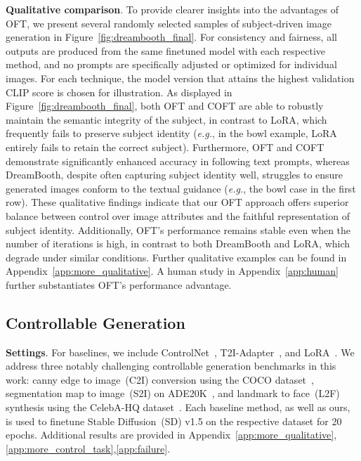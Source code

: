 \textbf{Qualitative comparison}. To provide clearer insights into the advantages of OFT, we present several randomly selected samples of subject-driven image generation in Figure~\ref{fig:dreambooth_final}. For consistency and fairness, all outputs are produced from the same finetuned model with each respective method, and no prompts are specifically adjusted or optimized for individual images. For each technique, the model version that attains the highest validation CLIP score is chosen for illustration. As displayed in Figure~\ref{fig:dreambooth_final}, both OFT and COFT are able to robustly maintain the semantic integrity of the subject, in contrast to LoRA, which frequently fails to preserve subject identity (\emph{e.g.}, in the bowl example, LoRA entirely fails to retain the correct subject). Furthermore, OFT and COFT demonstrate significantly enhanced accuracy in following text prompts, whereas DreamBooth, despite often capturing subject identity well, struggles to ensure generated images conform to the textual guidance (\emph{e.g.}, the bowl case in the first row). These qualitative findings indicate that our OFT approach offers superior balance between control over image attributes and the faithful representation of subject identity. Additionally, OFT's performance remains stable even when the number of iterations is high, in contrast to both DreamBooth and LoRA, which degrade under similar conditions. Further qualitative examples can be found in Appendix~\ref{app:more_qualitative}. A human study in Appendix~\ref{app:human} further substantiates OFT's performance advantage.

\subsection{Controllable Generation}

\textbf{Settings}. For baselines, we include ControlNet~\cite{zhang2023adding}, T2I-Adapter~\cite{mou2023t2i}, and LoRA~\cite{hulora2022}. We address three notably challenging controllable generation benchmarks in this work: canny edge to image~(C2I) conversion using the COCO dataset~\cite{lin2014microsoft}, segmentation map to image~(S2I) on ADE20K~\cite{zhou2017scene}, and landmark to face~(L2F) synthesis using the CelebA-HQ dataset~\cite{karras2018progressive,xia2021tedigan}. Each baseline method, as well as ours, is used to finetune Stable Diffusion~(SD) v1.5 on the respective dataset for 20 epochs. Additional results are provided in Appendix~\ref{app:more_qualitative},\ref{app:more_control_task},\ref{app:failure}.

